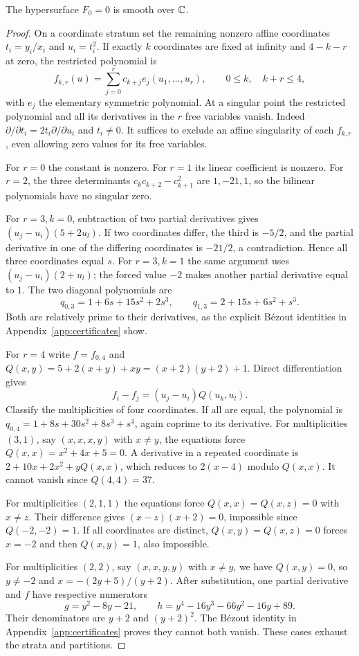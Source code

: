 \begin{lemma}\label{lem:smoothseed}
The hypersurface $F_0=0$ is smooth over $\mathbb{C}$.
\end{lemma}
\begin{proof}
On a coordinate stratum set the remaining nonzero affine coordinates
$t_i=y_i/x_i$ and $u_i=t_i^2$. If exactly $k$ coordinates are fixed at
infinity and $4-k-r$ at zero, the restricted polynomial is
\[
 f_{k,r}(u)=\sum_{j=0}^r c_{k+j}e_j(u_1,\ldots,u_r),
 \qquad 0\le k,\quad k+r\le4,
\]
with $e_j$ the elementary symmetric polynomial. At a singular point the
restricted polynomial and all its derivatives in the $r$ free variables
vanish. Indeed $\partial/\partial t_i=2t_i\partial/\partial u_i$ and
$t_i\ne0$. It suffices to exclude an affine singularity of each $f_{k,r}$,
even allowing zero values for its free variables.

For $r=0$ the constant is nonzero. For $r=1$ its linear coefficient is
nonzero. For $r=2$, the three determinants
$c_kc_{k+2}-c_{k+1}^2$ are $1,-21,1$, so the bilinear polynomials have
no singular zero.

For $r=3,k=0$, subtraction of two partial derivatives gives
$(u_j-u_i)(5+2u_l)$. If two coordinates differ, the third is $-5/2$,
and the partial derivative in one of the differing coordinates is
$-21/2$, a contradiction. Hence all three coordinates equal $s$.
For $r=3,k=1$ the same argument uses $(u_j-u_i)(2+u_l)$;
the forced value $-2$ makes another partial derivative equal to $1$.
The two diagonal polynomials are
\[
 q_{0,3}=1+6s+15s^2+2s^3,\qquad
 q_{1,3}=2+15s+6s^2+s^3.
\]
Both are relatively prime to their derivatives, as the explicit
B\'ezout identities in Appendix~\ref{app:certificates} show.

For $r=4$ write $f=f_{0,4}$ and
$Q(x,y)=5+2(x+y)+xy=(x+2)(y+2)+1$. Direct differentiation gives
\[
 f_i-f_j=(u_j-u_i)Q(u_k,u_l).
\]
Classify the multiplicities of four coordinates. If all are equal,
the polynomial is $q_{0,4}=1+8s+30s^2+8s^3+s^4$, again coprime to
its derivative. For multiplicities $(3,1)$, say $(x,x,x,y)$ with
$x\ne y$, the equations force $Q(x,x)=x^2+4x+5=0$.
A derivative in a repeated coordinate is $2+10x+2x^2+yQ(x,x)$,
which reduces to $2(x-4)$ modulo $Q(x,x)$. It cannot vanish since
$Q(4,4)=37$.

For multiplicities $(2,1,1)$ the equations force
$Q(x,x)=Q(x,z)=0$ with $x\ne z$. Their difference gives
$(x-z)(x+2)=0$, impossible since $Q(-2,-2)=1$. If all coordinates
are distinct, $Q(x,y)=Q(x,z)=0$ forces $x=-2$ and then $Q(x,y)=1$,
also impossible.

For multiplicities $(2,2)$, say $(x,x,y,y)$ with $x\ne y$, we have
$Q(x,y)=0$, so $y\ne-2$ and $x=-(2y+5)/(y+2)$.
After substitution, one partial derivative and $f$ have respective
numerators
\[
 g=y^2-8y-21,\qquad h=y^4-16y^3-66y^2-16y+89.
\]
Their denominators are $y+2$ and $(y+2)^2$.
The B\'ezout identity in Appendix~\ref{app:certificates} proves they
cannot both vanish. These cases exhaust the strata and partitions.
\end{proof}

